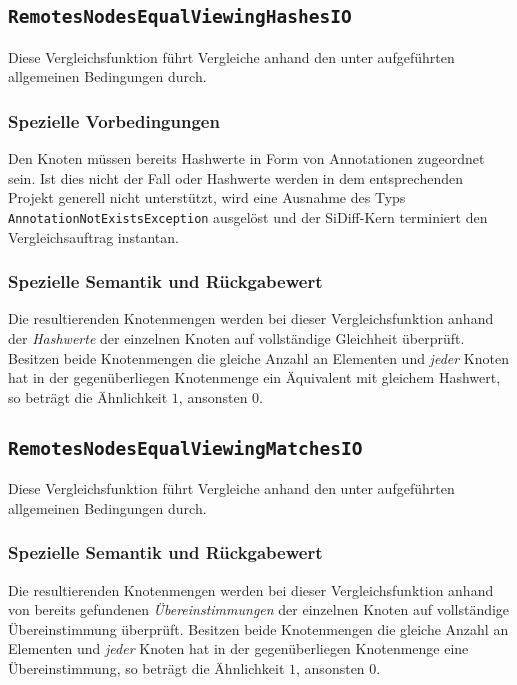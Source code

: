 \subsection{\texttt{RemotesNodesEqualViewingHashesIO}}
Diese Vergleichsfunktion führt Vergleiche anhand den unter  aufgeführten allgemeinen Bedingungen durch.

\subsubsection*{Spezielle Vorbedingungen}
Den Knoten müssen bereits Hashwerte in Form von Annotationen zugeordnet sein. Ist dies nicht der Fall oder Hashwerte werden in dem entsprechenden Projekt generell nicht unterstützt, wird eine Ausnahme des Typs \texttt{AnnotationNotExistsException} ausgelöst und der SiDiff-Kern terminiert den Vergleichsauftrag instantan.

\subsubsection*{Spezielle Semantik und Rückgabewert}
Die resultierenden Knotenmengen werden bei dieser Vergleichsfunktion anhand der \emph{Hashwerte} der einzelnen Knoten auf vollständige Gleichheit überprüft. Besitzen beide Knotenmengen die gleiche Anzahl an Elementen und \emph{jeder} Knoten hat in der gegenüberliegen Knotenmenge ein Äquivalent mit gleichem Hashwert, so beträgt die Ähnlichkeit $1$, ansonsten $0$.


%
%
\subsection{\texttt{RemotesNodesEqualViewingMatchesIO}}
Diese Vergleichsfunktion führt Vergleiche anhand den unter  aufgeführten allgemeinen Bedingungen durch.

\subsubsection*{Spezielle Semantik und Rückgabewert}
Die resultierenden Knotenmengen werden bei dieser Vergleichsfunktion anhand von bereits gefundenen \emph{Übereinstimmungen} der einzelnen Knoten auf vollständige Übereinstimmung überprüft. Besitzen beide Knotenmengen die gleiche Anzahl an Elementen und \emph{jeder} Knoten hat in der gegenüberliegen Knotenmenge eine Übereinstimmung, so beträgt die Ähnlichkeit $1$, ansonsten $0$.


